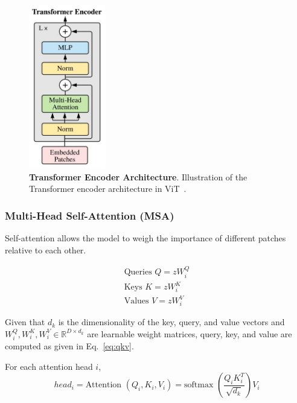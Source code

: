 \begin{figure}
	\centering
	\includegraphics[width=0.3\textwidth]{Images/main/transformerblock.png}
	\caption[\textbf{Transformer Encoder Architecture}]{\textbf{Transformer Encoder Architecture}. Illustration of the Transformer encoder architecture in ViT~\cite{dosovitskiy2020image}.}
	\label{fig:transformer_encoder}
\end{figure}

\subsubsection{Multi-Head Self-Attention (MSA)}
Self-attention allows the model to weigh the importance of different patches relative to each other.

\begin{subequations}
	\label{eq:qkv}
	\begin{align}
		\text{Queries  } Q = zW^{Q}_i \label{eq:query} \\
		\text{Keys  } K= zW^{K}_i \label{eq:key} \\
		\text{Values  } V = zW^{V}_i \label{eq:value}
	\end{align}
\end{subequations}

Given that \(d_k\) is the dimensionality of the key, query, and value vectors and \(W^Q_i, W^K_i, W^V_i \in \mathbb{R}^{D \times d_k }\) are learnable weight matrices, query, key, and value are computed as given in Eq.~\ref{eq:qkv}.


For each attention head \(i\),
\begin{equation}
	head_i =
	\text{Attention  }(Q_i,K_i,V_i) = \text{softmax  } \left(\frac{Q_iK^{T}_i}{\sqrt{d_k}}\right)V_i
\end{equation}


